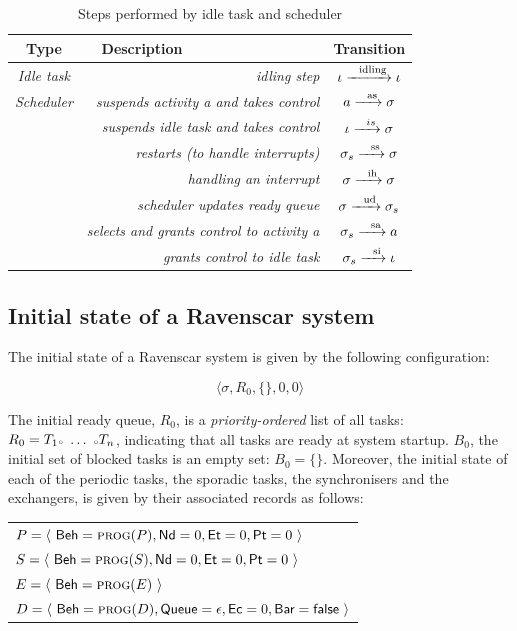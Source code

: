 \begin{table}
\caption{Steps performed by idle task and scheduler}
\label{legal_idle_sched}
\centering
\begin{tabular}{|c|r|c|}
\hline
\textbf{Type} & \textbf{Description\ \ \ \ \ \ \ \ \ \ \ \ \ \ \ \ \ } & \textbf{Transition}\\
\hline
\emph{Idle task} & \emph{idling step} & $\iota \xrightarrow{\ \ \text{idling}}
\iota$\\
\hline
\emph{Scheduler} & \emph{suspends activity a and takes control} & $a
\xrightarrow{\ \ \text{as}} \sigma$\\
 & \emph{suspends idle task and takes control} &
$\iota\xrightarrow{\ \ is}\sigma$\\ 
 & \emph{restarts (to handle
  interrupts)} & $\sigma_s\xrightarrow{\ \ \text{ss}}\sigma$\\ 
 & \emph{handling an interrupt} & $\sigma\xrightarrow{\ \ \text{ih}}\sigma$\\
 & \emph{scheduler updates ready queue} &
$\sigma\xrightarrow{\ \ \text{ud}}\sigma_s$\\ 
 & \emph{selects and grants control to activity a} &
$\sigma_s\xrightarrow{\ \ \text{sa}}a$\\ 
 & \emph{grants control to idle task} &
$\sigma_s\xrightarrow{\ \ \text{si}}\iota$\\
\hline
\end{tabular}
\end{table}

\subsection{Initial state of a Ravenscar system}

The initial state of a Ravenscar system is given by the following configuration:

\begin{equation}
  \big\langle \sigma, R_0, \{\}, 0, 0 \big\rangle
\end{equation}

The initial ready queue, $R_0$, is a \emph{priority-ordered} list of
all tasks: $ R_0 = T_1 {\scriptscriptstyle \circ} \ \ldots \ {\scriptscriptstyle \circ} T_n$, indicating
that all tasks are ready at system startup. $B_0$, the initial set of
blocked tasks is an empty set: $B_0=\{\}$. Moreover, the initial state
of each of the periodic tasks, the sporadic tasks, the synchronisers
and the exchangers, is given by their associated records as follows:\\

\begin{tabular}{l}
$P =
  \langle \ 
    \SFT{Beh}= \text{\scshape prog}(P), \SFT{Nd}=0, \SFT{Et}=0, \SFT{Pt}=0 
  \ \rangle$\\
$S =
  \langle \ 
    \SFT{Beh}= \text{\scshape prog}(S), \SFT{Nd}=0, \SFT{Et}=0, \SFT{Pt}=0
  \ \rangle$\\
$E =
  \langle \ 
    \SFT{Beh}= \text{\scshape prog}(E)
  \ \rangle$
  \\
$D =
  \langle \ 
    \SFT{Beh}= \text{\scshape prog}(D), \SFT{Queue}=\epsilon, \SFT{Ec}=0, \SFT{Bar}=\SFT{false}
  \ \rangle$\\
\end{tabular}

